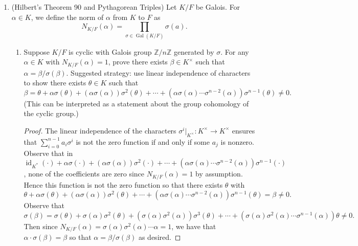 \documentclass[11pt]{article}
\DeclareMathOperator{\Gal}{Gal}
\DeclareMathOperator{\id}{id}
\begin{document}
\begin{enumerate}
\begin{proof}
        We show that $K = \mathbb{Q}(\sqrt{2+\sqrt{2}})$ is the splitting field for this polynomial by obtaining the other conjugates, namely $\sqrt{2-\sqrt{2}}$: Observe that for $\alpha_1 = \sqrt{2+\sqrt{2}}$, we have $\sqrt{2} = \alpha_1^2-2\in K$ so that the quotient $\frac{\sqrt{2}}{\sqrt{2+\sqrt{2}}} = \sqrt{2-\sqrt{2}}\in K$ as desired. Hence $K$ is a degree $4$ Galois extension of $\mathbb{Q}$.

        Now we show that there is an automorphism of order $4$ so that $\Gal(K/\mathbb{Q})$ is not the Klein $4$-group: Take the map $f$ sending $\sqrt{2+\sqrt{2}}$ to $\sqrt{2-\sqrt{2}}$; it follows that $f$ sends $\sqrt{2}$ to $-\sqrt{2}$. Furthermore, $f$ sends $\sqrt{2-\sqrt{2}} = \frac{\sqrt{2}}{\sqrt{2+\sqrt{2}}}$ to $\frac{-\sqrt{2}}{\sqrt{2-\sqrt{2}}} = -\sqrt{2+\sqrt{2}}$, which is sent to $-\sqrt{2-\sqrt{2}}$, sent back to $\sqrt{2+\sqrt{2}}$. Thus $f$ has order $4$. It follows that $\Gal(K/\mathbb{Q})$ is cyclic of order $4$.
    \end{proof}
    \item (Hilbert's Theorem 90 and Pythagorean Triples) Let $K/F$ be Galois. For $\alpha \in K$, we define
    the norm of $\alpha$ from $K$ to $F$ as \[N_{K/F}(\alpha) = \prod_{\sigma\in\Gal(K/F)}\sigma(a).\]\begin{enumerate}
        \item Suppose $K/F$ is cyclic with Galois group $\mathbb{Z}/n\mathbb{Z}$ generated by $\sigma$. For any $\alpha\in K$ with $N_{K/F}(\alpha) = 1$, prove there exists $\beta\in K^\times$ such that $\alpha = \beta/\sigma(\beta)$. Suggested strategy: use linear independence of characters to show there exists $\theta\in K$ such that \[\beta = \theta + \alpha\sigma(\theta) + (\alpha\sigma(\alpha))\sigma^2(\theta) + \cdots + (\alpha\sigma(\alpha)\cdots\sigma^{n-2}(\alpha))\sigma^{n-1}(\theta)\neq 0.\] (This can be interpreted as a statement about the group cohomology of the cyclic group.) \begin{proof}
            The linear independence of the characters $\sigma^i\vert_{K^\times}\colon K^\times\to K^\times$ ensures that $\sum_{i=0}^{n-1}a_i\sigma^i$ is not the zero function if and only if some $a_j$ is nonzero. Observe that in $\id_{K^\ast}(\cdot) + \alpha\sigma(\cdot) + (\alpha\sigma(\alpha))\sigma^2(\cdot) + \cdots + (\alpha\sigma(\alpha)\cdots\sigma^{n-2}(\alpha))\sigma^{n-1}(\cdot)$, none of the coefficients are zero since $N_{K/F}(\alpha) = 1$ by assumption. Hence this function is not the zero function so that there exists $\theta$ with \[\theta + \alpha\sigma(\theta) + (\alpha\sigma(\alpha))\sigma^2(\theta) + \cdots + (\alpha\sigma(\alpha)\cdots\sigma^{n-2}(\alpha))\sigma^{n-1}(\theta) = \beta \neq 0.\] Observe that \[\sigma(\beta) = \sigma(\theta) + \sigma(\alpha)\sigma^2(\theta) + (\sigma(\alpha)\sigma^2(\alpha))\sigma^3(\theta) + \cdots + (\sigma(\alpha)\sigma^2(\alpha)\cdots\sigma^{n-1}(\alpha))\theta\neq 0.\] Then since $N_{K/F}(\alpha) = \sigma(\alpha)\sigma^2(\alpha)\cdots\alpha = 1$, we have that $\alpha\cdot\sigma(\beta) = \beta$ so that $\alpha = \beta/\sigma(\beta)$ as desired.

\end{proof}
\end{enumerate}
\end{enumerate}
\end{document}
